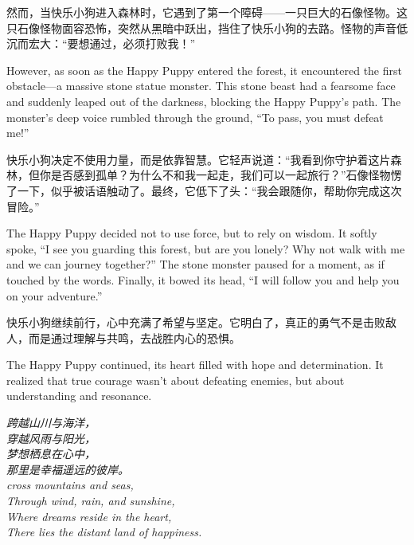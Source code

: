 然而，当快乐小狗进入森林时，它遇到了第一个障碍——一只巨大的石像怪物。这只石像怪物面容恐怖，突然从黑暗中跃出，挡住了快乐小狗的去路。怪物的声音低沉而宏大：“要想通过，必须打败我！”

\begin{flushright}
However, as soon as the Happy Puppy entered the forest, it encountered the first obstacle—a massive stone statue monster. This stone beast had a fearsome face and suddenly leaped out of the darkness, blocking the Happy Puppy’s path. The monster’s deep voice rumbled through the ground, “To pass, you must defeat me!”
\end{flushright}

快乐小狗决定不使用力量，而是依靠智慧。它轻声说道：“我看到你守护着这片森林，但你是否感到孤单？为什么不和我一起走，我们可以一起旅行？”石像怪物愣了一下，似乎被话语触动了。最终，它低下了头：“我会跟随你，帮助你完成这次冒险。”

\begin{flushright}
The Happy Puppy decided not to use force, but to rely on wisdom. It softly spoke, “I see you guarding this forest, but are you lonely? Why not walk with me and we can journey together?” The stone monster paused for a moment, as if touched by the words. Finally, it bowed its head, “I will follow you and help you on your adventure.”
\end{flushright}

快乐小狗继续前行，心中充满了希望与坚定。它明白了，真正的勇气不是击败敌人，而是通过理解与共鸣，去战胜内心的恐惧。

\begin{flushright}
The Happy Puppy continued, its heart filled with hope and determination. It realized that true courage wasn’t about defeating enemies, but about understanding and resonance.
\end{flushright}

\begin{center}
    \textit{
    跨越山川与海洋，\\
    穿越风雨与阳光，\\
    梦想栖息在心中，\\
    那里是幸福遥远的彼岸。 \\
    cross mountains and seas,\\
    Through wind, rain, and sunshine,\\
    Where dreams reside in the heart,\\
    There lies the distant land of happiness.
    }
    \end{center}

